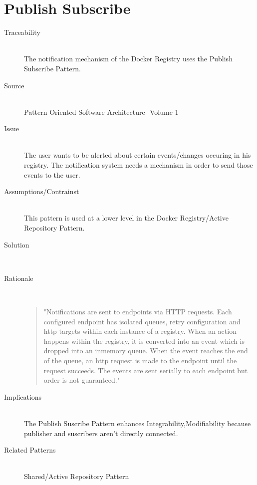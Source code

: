 \section{Publish Subscribe}
\begin{description}

\item[Traceability]~\\
The notification mechanism of the Docker Registry uses the Publish Subscribe Pattern.

\item[Source]~\\
Pattern Oriented Software Architecture- Volume 1

\item[Issue]~\\ The user wants to be alerted about certain events/changes occuring in his registry.
The notification system needs a mechanism in order to send those events to the user.

\item[Assumptions/Contrainst]~\\ This pattern is used at a lower level in the Docker Registry/Active Repository Pattern.

\item[Solution]~\\

\item[Rationale]~\\ 

\begin{quote}
"Notifications are sent to endpoints via HTTP requests. Each configured endpoint has isolated queues, retry configuration and http targets within each instance of a registry. When an action happens within the registry, it is converted into an event which is dropped into an inmemory queue. When the event reaches the end of the queue, an http request is made to the endpoint until the request succeeds. The events are sent serially to each endpoint but order is not guaranteed."%
\end{quote} 

\item[Implications]~\\ %
The Publish Suscribe Pattern enhances Integrability,Modifiability because publisher and suscribers aren't directly connected.%

\item [Related Patterns]~\\
Shared/Active Repository Pattern


\end{description}

